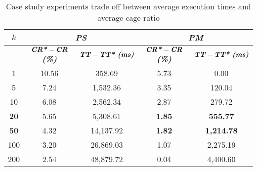 \begin{table}[htbp]
    \caption{Case study experiments trade off between average execution times and average cage ratio}
    \centering
    \begin{tabular}{|c|c|c|c|c|}
    \hline
    \multicolumn{1}{|c|}{\textbf{$k$}} & \multicolumn{ 2}{c|}{\textbf{\textit{PS}}} & \multicolumn{ 2}{c|}{\textbf{\textit{PM}}} \\ \hline
    \multicolumn{1}{|c|}{} & $\textbf{\textit{CR*}} - \textbf{\textit{CR}}$ \textbf{\textit{(\%)}} & $\textbf{\textit{TT}} - \textbf{\textit{TT* (ms)}}$ & $\textbf{\textit{CR*}} - \textbf{\textit{CR}}$ \textbf{\textit{(\%)}} & $\textbf{\textit{TT}} - \textbf{\textit{TT* (ms)}}$ \\ \hline
    1 & 10.56 & 358.69 & 5.73 & 0.00 \\
    5 & 7.24 & 1,532.36 & 3.35 & 120.04 \\
    10 & 6.08 & 2,562.34 & 2.87 & 279.72 \\
    \textbf{20} & 5.65 & 5,308.61 & \textbf{1.85} & \textbf{555.77} \\
    \textbf{50} & 4.32 & 14,137.92 & \textbf{1.82} & \textbf{1,214.78} \\
    100 & 3.20 & 26,869.03 & 1.07 & 2,275.19 \\
    200 & 2.54 & 48,879.72 & 0.04 & 4,400.60 \\ \hline
    \end{tabular}
    \label{exp:usecase_tradeoff}
\end{table}
    